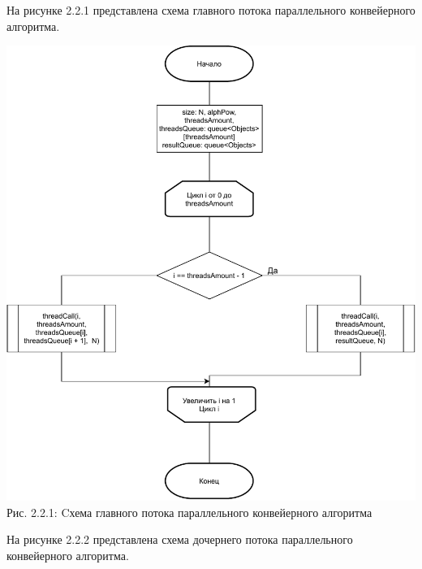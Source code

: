 \documentclass[12pt,a4paper]{article}
\numberwithin{equation}{section}
\begin{document}
\clearpage
На рисунке 2.2.1 представлена схема главного потока параллельного конвейерного алгоритма.\\
\begin{center}	
	\includegraphics[width=1\linewidth]{src/schemas/parallel_main}\\
	Рис. 2.2.1: Cхема главного потока параллельного конвейерного алгоритма
\end{center}
\clearpage
На рисунке 2.2.2 представлена схема дочернего потока параллельного конвейерного алгоритма.\\
\end{document}
